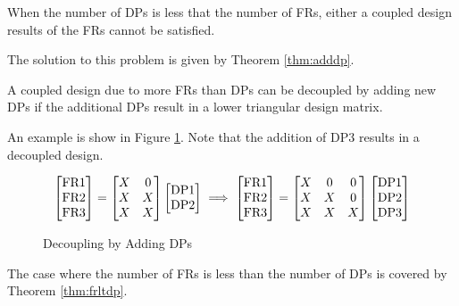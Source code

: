 \begin{theorem}
  \label{thm:frgdp}
  When the number of DPs is less that the number of FRs, either a coupled design results of the FRs cannot be
  satisfied.
\end{theorem}

The solution to this problem is given by Theorem \ref{thm:adddp}.
\begin{theorem}
  \label{thm:adddp}
  A coupled design due to more FRs than DPs can be decoupled by adding new DPs if the additional DPs result in a
  lower triangular design matrix.
\end{theorem}

An example is show in Figure \ref{fig:dcexample}.  Note that the addition of DP3 results in a decoupled design.

\begin{figure}[h]
  \label{fig:dcexample}
  \[\begin{bmatrix}
  \text{FR}1 \\ \text{FR}2 \\ \text{FR}3
  \end{bmatrix}=\begin{bmatrix}
  X & 0 \\
  X & X \\
  X & X \\
  \end{bmatrix}\begin{bmatrix}
    \text{DP}1 \\ \text{DP}2 \\
  \end{bmatrix}\implies\begin{bmatrix}
  \text{FR}1 \\ \text{FR}2 \\ \text{FR}3
  \end{bmatrix}=\begin{bmatrix}
  X & 0 & 0 \\
  X & X & 0 \\
  X & X & X \\
  \end{bmatrix}\begin{bmatrix}
    \text{DP}1 \\ \text{DP}2 \\ \text{DP}3
  \end{bmatrix}\]
  \caption{Decoupling by Adding DPs}
\end{figure}

The case where the number of FRs is less than the number of DPs is covered by Theorem \ref{thm:frltdp}.

